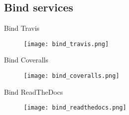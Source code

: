 \subsection{Bind services}
\begin{frame}{Bind Travis}
    \begin{figure}
        \texttt{[image: bind\_travis.png]}
    \end{figure}
\end{frame}
\begin{frame}{Bind Coveralls}
    \begin{figure}
        \texttt{[image: bind\_coveralls.png]}
    \end{figure}
\end{frame}
\begin{frame}{Bind ReadTheDocs}
    \begin{figure}
        \texttt{[image: bind\_readthedocs.png]}
    \end{figure}
\end{frame}
